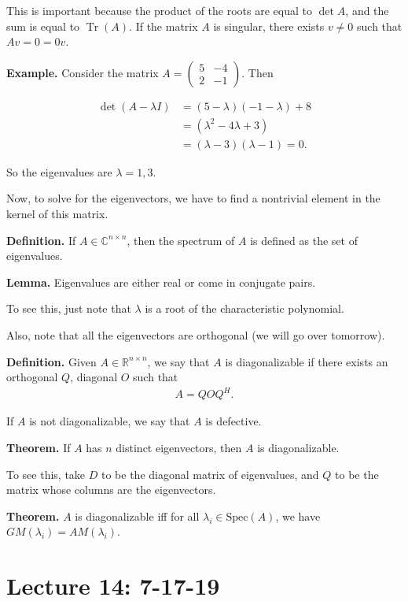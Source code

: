 \documentclass{article}
\newcommand{\mat}[1]{\begin{pmatrix}#1\end{pmatrix}}
\DeclareMathOperator{\Tr}{Tr}
\begin{document}
This is important because the product of the roots are equal to $\det A$, and the sum is equal to $\Tr(A)$.  If the matrix $A$ is singular, there exists $v \neq 0$ such that $A v = 0 =0 v$.

{\bf Example.} Consider the matrix $A = \mat{5 & -4 \\ 2 & -1}$.  Then

\begin{align*}
  \det (A - \lambda I) &= (5 - \lambda)(-1 - \lambda) + 8 \\
  &= (\lambda^2 - 4 \lambda + 3)\\
  &= (\lambda - 3)(\lambda - 1) = 0.
\end{align*}

So the eigenvalues are $\lambda = 1, 3$.

Now, to solve for the eigenvectors, we have to find a nontrivial element in the kernel of this matrix.

{\bf Definition.} If $A \in \mathbb{C}^{n \times n}$, then the spectrum of $A$ is defined as the set of eigenvalues.

{\bf Lemma.} Eigenvalues are either real or come in conjugate pairs.

To see this, just note that $\lambda$ is a root of the characteristic polynomial.

Also, note that all the eigenvectors are orthogonal (we will go over tomorrow).

{\bf Definition.} Given $A \in \mathbb{R}^{n \times n}$, we say that $A$ is diagonalizable if there exists an orthogonal $Q$, diagonal $O$ such that
\begin{align*}
  A = Q O Q^H.
\end{align*}

If $A$ is not diagonalizable, we say that $A$ is defective.

{\bf Theorem.} If $A$ has $n$ distinct eigenvectors, then $A$ is diagonalizable.

To see this, take $D$ to be the diagonal matrix of eigenvalues, and $Q$ to be the matrix whose columns are the eigenvectors.

{\bf Theorem.} $A$ is diagonalizable iff for all $\lambda_i \in \text{Spec}(A)$, we have $GM(\lambda_i) = AM(\lambda_i)$.



\section{Lecture 14: 7-17-19}
\end{document}
